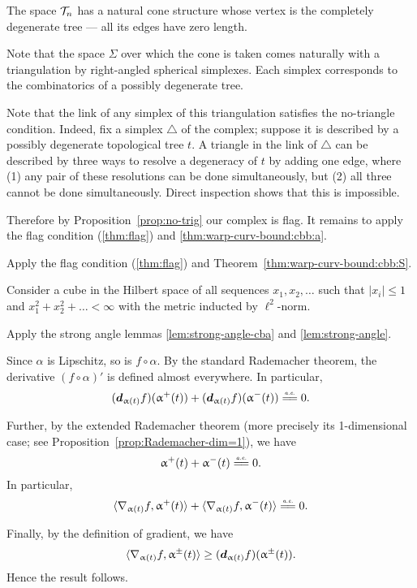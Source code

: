 The space $\mathcal{T}_n$ has a natural cone structure whose vertex is the  completely degenerate tree --- all its edges have zero length.

Note that the space $\Sigma$
over which the cone is taken comes naturally with a triangulation 
by right-angled spherical simplexes.
Each simplex corresponds to the combinatorics of a possibly degenerate tree.

Note that the link of any simplex of this triangulation satisfies the no-triangle condition.
Indeed, fix a simplex $\triangle$ of the complex;
suppose it is described by a possibly degenerate topological tree $t$.
A triangle in the link of  $\triangle$ can be described by three ways to resolve a degeneracy of $t$ by adding one edge, where 
(1) any pair of these resolutions can be done simultaneously, but (2) all three cannot be done simultaneously.
Direct inspection shows that this is impossible.

Therefore by Proposition~\ref{prop:no-trig} our complex is flag.
It remains to apply the flag condition (\ref{thm:flag}) and \ref{thm:warp-curv-bound:cbb:a}.

Apply the flag condition (\ref{thm:flag}) and Theorem~\ref{thm:warp-curv-bound:cbb:S}.

Consider a cube in the Hilbert space
of all sequences $x_1,x_2,\dots$ such that $|x_i|\le 1$ and $x_1^2+x_2^2+\dots<\infty$ with the metric inducted by $\ell^2$-norm.

 Apply the strong angle lemmas
\ref{lem:strong-angle-cba}
and \ref{lem:strong-angle}.


Since $\alpha$ is Lipschitz, so is $f\circ\alpha$.
By the standard Rademacher theorem, the derivative $(f\circ\alpha)'$ is defined almost everywhere.
In particular, 
\[(\dd_{\alpha(t)}f)(\alpha^+(t))+(\dd_{\alpha(t)}f)(\alpha^-(t))\ae0.\]

Further, by the extended Rademacher theorem (more precisely its 1-dimensional case; see Proposition~\ref{prop:Rademacher-dim=1}),
we have 
\[\alpha^+(t)+\alpha^-(t)\ae0.\]
In particular,
\[\<\nabla_{\alpha(t)}f,\alpha^+(t)\>+\<\nabla_{\alpha(t)}f,\alpha^-(t)\>
\ae0.\]

Finally, by the definition of gradient, we have 
\[\<\nabla_{\alpha(t)}f,\alpha^\pm(t)\>\ge (\dd_{\alpha(t)}f)(\alpha^\pm(t)).\]
Hence the result follows.

